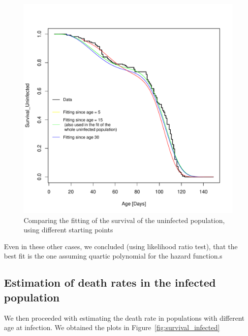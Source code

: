 \documentclass[10pt]{article}         %
\begin{document}
\begin{figure}
\includegraphics[width=\textwidth]{uninfected_population_survival_and_fit_different_starts_of_fitting.pdf}
\caption{Comparing the fitting of the survival of the uninfected population, using different starting points}
\label{fig:comparison_different_baselines}
\end{figure}

Even in these other cases, we concluded (using likelihood ratio test), that the best fit is the one assuming quartic polynomial for the hazard function.s

\subsection{Estimation of death rates in the infected population}

We then proceeded with estimating the death rate in populations with different age at infection. We obtained the plots in Figure~\ref{fig:survival_infected}
\end{document}
